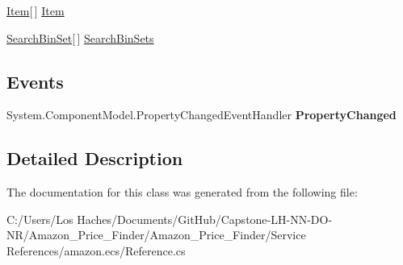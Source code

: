 \begin{DoxyCompactItemize}
\begin{DoxyCompactList}\small\item\em \end{DoxyCompactList}\item 
\hypertarget{class_amazon___price___finder_1_1amazon_1_1ecs_1_1_items_ab52ed1bcddcb4ec910cecf075434dcef}{\hyperlink{class_amazon___price___finder_1_1amazon_1_1ecs_1_1_item}{Item}\mbox{[}$\,$\mbox{]} \hyperlink{class_amazon___price___finder_1_1amazon_1_1ecs_1_1_items_ab52ed1bcddcb4ec910cecf075434dcef}{Item}}\label{class_amazon___price___finder_1_1amazon_1_1ecs_1_1_items_ab52ed1bcddcb4ec910cecf075434dcef}

\begin{DoxyCompactList}\small\item\em \end{DoxyCompactList}\item 
\hypertarget{class_amazon___price___finder_1_1amazon_1_1ecs_1_1_items_a0c901e7ad1da8bfac0abb93a06b9842f}{\hyperlink{class_amazon___price___finder_1_1amazon_1_1ecs_1_1_search_bin_set}{Search\-Bin\-Set}\mbox{[}$\,$\mbox{]} \hyperlink{class_amazon___price___finder_1_1amazon_1_1ecs_1_1_items_a0c901e7ad1da8bfac0abb93a06b9842f}{Search\-Bin\-Sets}}\label{class_amazon___price___finder_1_1amazon_1_1ecs_1_1_items_a0c901e7ad1da8bfac0abb93a06b9842f}

\begin{DoxyCompactList}\small\item\em \end{DoxyCompactList}\end{DoxyCompactItemize}
\subsection*{Events}
\begin{DoxyCompactItemize}
\item 
\hypertarget{class_amazon___price___finder_1_1amazon_1_1ecs_1_1_items_af88a366da805b2ae08c8d82303890edb}{System.\-Component\-Model.\-Property\-Changed\-Event\-Handler {\bfseries Property\-Changed}}\label{class_amazon___price___finder_1_1amazon_1_1ecs_1_1_items_af88a366da805b2ae08c8d82303890edb}

\end{DoxyCompactItemize}


\subsection{Detailed Description}


The documentation for this class was generated from the following file\-:\begin{DoxyCompactItemize}
\item 
C\-:/\-Users/\-Los Haches/\-Documents/\-Git\-Hub/\-Capstone-\/\-L\-H-\/\-N\-N-\/\-D\-O-\/\-N\-R/\-Amazon\-\_\-\-Price\-\_\-\-Finder/\-Amazon\-\_\-\-Price\-\_\-\-Finder/\-Service References/amazon.\-ecs/Reference.\-cs\end{DoxyCompactItemize}
